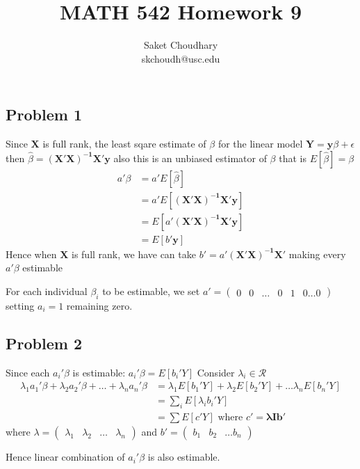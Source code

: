 \documentclass[a4paper]{article}
\title{MATH 542 Homework 9}
\author{Saket Choudhary\\skchoudh@usc.edu}
\begin{document}
\maketitle 
\subsection*{Problem 1}
Since $\mathbf{X}$ is full rank, the least sqare estimate of $\beta$ for the linear model $\mathbf{Y}=\mathbf{y}\beta+\epsilon$ then $\hat{\beta} = \mathbf{(X'X)^{-1}X'y}$ also this is an unbiased estimator of $\beta$ that is $E[\hat{\beta}]=\beta$
\begin{align*}
a'\beta &= a'E[\hat{\beta}]\\
&= a'E[\mathbf{(X'X)^{-1}X'y}]\\
&= E[a'\mathbf{(X'X)^{-1}X'y}]\\
&= E[b'\mathbf{y}]
\end{align*}
Hence when $\mathbf{X}$ is full rank, we have can take $b'=a'\mathbf{(X'X)^{-1}X'}$ making every $a'\beta$ estimable

For each individual $\beta_i$ to be estimable, we set $a'=\begin{pmatrix}0 & 0 & \dots & 0 & 1 & 0 \dots 0 \end{pmatrix}$
setting $a_i=1$ remaining zero.

\subsection*{Problem 2}
Since each $a_i'\beta$ is estimable: $a_i'\beta = E[b_i'Y]$
Consider $\lambda_i \in \mathcal{R}$
\begin{align*}
\lambda_1a_1'\beta + \lambda_2a_2'\beta + \dots + \lambda_na_n'\beta &= \lambda_1 E[b_1'Y] +  \lambda_2 E[b_2'Y] + \dots \lambda_n E[b_n'Y]\\
&= \sum_i E[\lambda_ib_i'Y]\\
&= \sum E[c'Y] \text{ where }c'= \mathbf{\lambda I b'}
\end{align*}
where $\lambda =  \begin{pmatrix}\lambda_1 & \lambda_2 &  \dots & \lambda_n \end{pmatrix}$ and $b' = \begin{pmatrix} b_1 & b_2 & \dots b_n \end{pmatrix}$

Hence linear combination of $a_i'\beta$ is also estimable.
\end{document}
